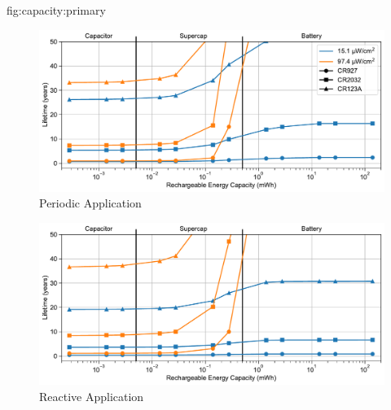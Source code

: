 \begin{definefigure}{fig:capacity:primary}
  \centering
  \begin{subfigure}{\columnwidth}
    \centering
    \includegraphics[width=\linewidth]{figs/capacity/primary/sense_and_send_life_vs_sec_size}
    \caption{Periodic Application}
    \label{fig:primary:sensesec}
  \end{subfigure}
  \begin{subfigure}{\columnwidth}
    \centering
    \includegraphics[width=\linewidth]{figs/capacity/primary/door_occu_life_vs_sec_size}
      \caption{Reactive Application}
    \label{fig:primary:eventsec}
  \end{subfigure}
  \caption{
    \normalfont
    Estimated lifetime
    when varying secondary energy capacity for different harvesting scenarios
    and backup energy storage sizes. 
    The periodic application's period
    is 30\,s and the reactive application events are scaled to
    represent a maximum of 2000 events per hour during the peak hour.
    The backup
    sizes correspond to those found in common coin cell batteries:
    90\ssi{\milli\Wh}, 720\ssi{\milli\Wh}, 4500\ssi{\milli\Wh} for the CR927, CR2032, and CR123A respectively.
    As the ability to capture
    more harvested energy increases, the sensors lifetime increases.
    In some scenarios, expected
    lifetime becomes unbounded as the device is able to subsist entirely on harvested
    energy.
    }
\end{definefigure}

